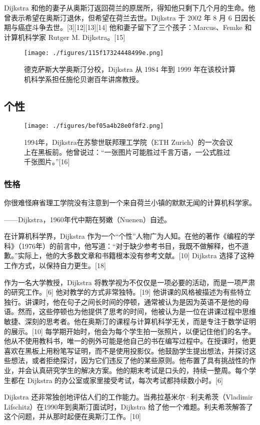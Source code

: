 Dijkstra 和他的妻子从奥斯汀返回荷兰的原居所，得知他只剩下几个月的生命。他曾表示希望在奥斯汀退休，但希望在荷兰去世。Dijkstra 于 2002 年 8 月 6 日因长期与癌症斗争去世。[3][12][13][14] 他和妻子留下了三个孩子：Marcus、Femke 和计算机科学家 Rutger M. Dijkstra。[15]
\begin{figure}[ht]
\centering
\texttt{[image: ./figures/115f17324448499e.png]}
\caption{德克萨斯大学奥斯汀分校，Dijkstra 从 1984 年到 1999 年在该校计算机科学系担任施伦贝谢百年讲席教授。} \label{fig_ACHR_3}
\end{figure}
\subsection{个性}
\begin{figure}[ht]
\centering
\texttt{[image: ./figures/bef05a4b28e0f8f2.png]}
\caption{1994年，Dijkstra在苏黎世联邦理工学院（ETH Zurich）的一次会议上在黑板前。他曾说过：“一张图片可能胜过千言万语，一公式胜过千张图片。”[16]} \label{fig_ACHR_4}
\end{figure}
\subsubsection{性格}
你很难怪麻省理工学院没有注意到一个来自荷兰小镇的默默无闻的计算机科学家。

——Dijkstra，1960年代中期在努嫩（Nuenen）自述。

在计算机科学界，Dijkstra 作为一个“个性”人物广为人知。在他的著作《编程的学科》（1976年）的前言中，他写道：“对于缺少参考书目，我既不做解释，也不道歉。”实际上，他的大多数文章和书籍根本没有参考文献。[10] Dijkstra 选择了这种工作方式，以保持自力更生。[18]

作为一名大学教授，Dijkstra 将教学视为不仅仅是一项必要的活动，而是一项严肃的研究工作。[6] 他对教学的方式非常独特。[19] 他讲课的风格被描述为有些特立独行。讲课时，他在句子之间长时间的停顿，通常被认为是因为英语不是他的母语。然而，这些停顿也为他提供了思考的时间，他被认为是一位在讲课过程中思维敏捷、深刻的思考者。他在奥斯汀的课程与计算机科学无关，而是专注于数学证明的展示。[10] 每学期开始时，他会为每个学生拍一张照片，以便记住他们的名字。他从不使用教科书，唯一的例外可能是他自己的书在编写过程中。在授课时，他更喜欢在黑板上用粉笔写证明，而不是使用投影仪。他鼓励学生提出想法，并探讨这些想法，或者拒绝探讨，因为它们违反了他的某些原则。他布置了具有挑战性的作业，并会认真研究学生的解决方案。他的期末考试是口头的，持续一整周。每个学生都在 Dijkstra 的办公室或家里接受考试，每次考试都持续数小时。[6]

Dijkstra 还非常独创地评估人们的工作能力。当弗拉基米尔·利夫希茨（Vladimir Lifschitz）在1990年到奥斯汀面试时，Dijkstra 给了他一个难题。利夫希茨解答了这个问题，并从那时起便在奥斯汀工作。[10]
